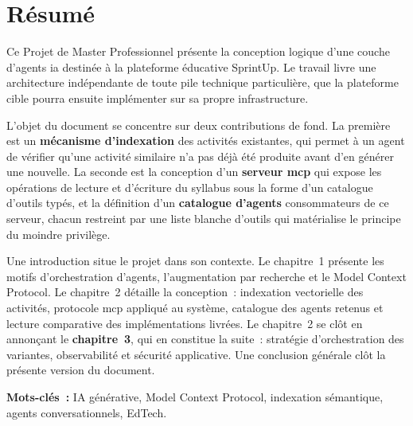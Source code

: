 \chapter*{Résumé}
\thispagestyle{plain}

\noindent
Ce Projet de Master Professionnel présente la conception logique d'une couche
d'agents \gls{ia} destinée à la plateforme éducative SprintUp. Le travail livre
une architecture indépendante de toute pile technique particulière, que la
plateforme cible pourra ensuite implémenter sur sa propre infrastructure.

L'objet du document se concentre sur deux contributions de fond. La première
est un \textbf{mécanisme d'indexation} des activités existantes, qui permet à
un agent de vérifier qu'une activité similaire n'a pas déjà été produite avant
d'en générer une nouvelle. La seconde est la conception d'un \textbf{serveur
\gls{mcp}} qui expose les opérations de lecture et d'écriture du syllabus sous
la forme d'un catalogue d'outils typés, et la définition d'un \textbf{catalogue
d'agents} consommateurs de ce serveur, chacun restreint par une liste blanche
d'outils qui matérialise le principe du moindre privilège.

Une introduction situe le projet dans son contexte. Le chapitre~1 présente
les motifs d'orchestration d'agents, l'augmentation par recherche et le Model
Context Protocol. Le chapitre~2 détaille la conception~: indexation vectorielle
des activités, protocole \gls{mcp} appliqué au système, catalogue des agents
retenus et lecture comparative des implémentations livrées. Le chapitre~2 se
clôt en annonçant le \textbf{chapitre~3}, qui en constitue la suite~: stratégie
d'orchestration des variantes, observabilité et sécurité applicative. Une
conclusion générale clôt la présente version du document.

\vspace{0.5cm}
\noindent
\textbf{Mots-clés~:} IA générative, Model Context Protocol, indexation
sémantique, agents conversationnels, EdTech.
\newpage
